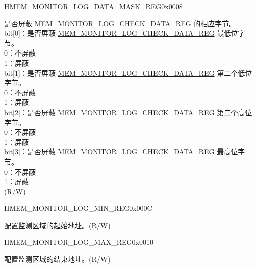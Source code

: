\begin{register}{H}{MEM\_MONITOR\_LOG\_DATA\_MASK\_REG}{0x0008}\label{regdesc:MEMMONITORLOGDATAMASKREG}
%
%
\regnewline%
\begin{regdesc}\begin{reglist}
\label{fielddesc:MEMMONITORLOGDATAMASK}\item[MEM\_MONITOR\_LOG\_DATA\_MASK] 是否屏蔽 \hyperref[regdesc:MEMMONITORLOGCHECKDATAREG]{MEM\_MONITOR\_LOG\_CHECK\_DATA\_REG} 的相应字节。\\
bit[0]：是否屏蔽 \hyperref[regdesc:MEMMONITORLOGCHECKDATAREG]{MEM\_MONITOR\_LOG\_CHECK\_DATA\_REG} 最低位字节。\\
0：不屏蔽\\
1：屏蔽\\
bit[1]：是否屏蔽 \hyperref[regdesc:MEMMONITORLOGCHECKDATAREG]{MEM\_MONITOR\_LOG\_CHECK\_DATA\_REG} 第二个低位字节。\\
0：不屏蔽\\
1：屏蔽\\
bit[2]：是否屏蔽 \hyperref[regdesc:MEMMONITORLOGCHECKDATAREG]{MEM\_MONITOR\_LOG\_CHECK\_DATA\_REG} 第二个高位字节。\\
0：不屏蔽\\
1：屏蔽\\
bit[3]：是否屏蔽 \hyperref[regdesc:MEMMONITORLOGCHECKDATAREG]{MEM\_MONITOR\_LOG\_CHECK\_DATA\_REG} 最高位字节。\\
0：不屏蔽\\
1：屏蔽\\
(R/W)
\end{reglist}\end{regdesc}
\end{register}


\begin{register}{H}{MEM\_MONITOR\_LOG\_MIN\_REG}{0x000C}\label{regdesc:MEMMONITORLOGMINREG}
%
\regnewline%
\begin{regdesc}\begin{reglist}
\label{fielddesc:MEMMONITORLOGMIN}\item [MEM\_MONITOR\_LOG\_MIN] 配置监测区域的起始地址。(R/W)
\end{reglist}\end{regdesc}
\end{register}


\begin{register}{H}{MEM\_MONITOR\_LOG\_MAX\_REG}{0x0010}\label{regdesc:MEMMONITORLOGMAXREG}
%
\regnewline%
\begin{regdesc}\begin{reglist}
\label{fielddesc:MEMMONITORLOGMAX}\item [MEM\_MONITOR\_LOG\_MAX] 配置监测区域的结束地址。(R/W)
\end{reglist}\end{regdesc}
\end{register}


